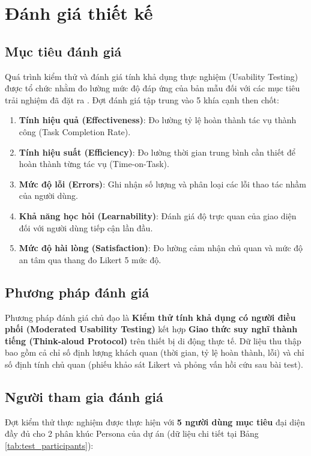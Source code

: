 \section{Đánh giá thiết kế}

\subsection{Mục tiêu đánh giá}
Quá trình kiểm thử và đánh giá tính khả dụng thực nghiệm (Usability Testing) được tổ chức nhằm đo lường mức độ đáp ứng của bản mẫu đối với các mục tiêu trải nghiệm đã đặt ra \cite{nielsen1994usability, brooke1996sus}. Đợt đánh giá tập trung vào 5 khía cạnh then chốt:
\begin{enumerate}
  \item \textbf{Tính hiệu quả (Effectiveness)}: Đo lường tỷ lệ hoàn thành tác vụ thành công (Task Completion Rate).
  \item \textbf{Tính hiệu suất (Efficiency)}: Đo lường thời gian trung bình cần thiết để hoàn thành từng tác vụ (Time-on-Task).
  \item \textbf{Mức độ lỗi (Errors)}: Ghi nhận số lượng và phân loại các lỗi thao tác nhầm của người dùng.
  \item \textbf{Khả năng học hỏi (Learnability)}: Đánh giá độ trực quan của giao diện đối với người dùng tiếp cận lần đầu.
  \item \textbf{Mức độ hài lòng (Satisfaction)}: Đo lường cảm nhận chủ quan và mức độ an tâm qua thang đo Likert 5 mức độ.
\end{enumerate}

\subsection{Phương pháp đánh giá}
Phương pháp đánh giá chủ đạo là \textbf{Kiểm thử tính khả dụng có người điều phối (Moderated Usability Testing)} kết hợp \textbf{Giao thức suy nghĩ thành tiếng (Think-aloud Protocol)} trên thiết bị di động thực tế. Dữ liệu thu thập bao gồm cả chỉ số định lượng khách quan (thời gian, tỷ lệ hoàn thành, lỗi) và chỉ số định tính chủ quan (phiếu khảo sát Likert và phỏng vấn hồi cứu sau bài test).

\subsection{Người tham gia đánh giá}
Đợt kiểm thử thực nghiệm được thực hiện với \textbf{5 người dùng mục tiêu} đại diện đầy đủ cho 2 phân khúc Persona của dự án (dữ liệu chi tiết tại Bảng \ref{tab:test_participants}):


